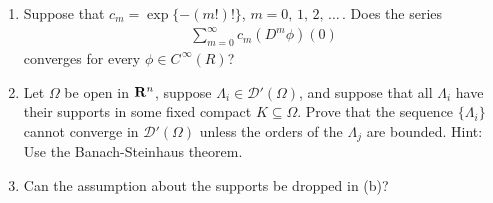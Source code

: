 %
\renewcommand{\labelenumi}{(\alph{enumi})} 
{\it 
\begin{enumerate}
\item Suppose that $c_m=\exp\{\minus (m!)!\}$, $m=0,\, 1,\, 2,\, \dots\, $. Does the series
\begin{align*}{
\sum_{m=0}^\infty c_m (D^m\phi)(0)
}\end{align*}
converges for every $\phi\in C^{\,\infty} (R)$?
\item Let $\Omega$ be open in ${\mathbf R}^n$, suppose $\Lambda_i\in \mathscr{D}'(\Omega)$, and suppose that all $\Lambda_i$ have their supports in some fixed compact $K\subseteq \Omega$. Prove that the sequence $\{\Lambda_i\}$ cannot converge in $\mathscr{D}'(\Omega)$ unless the orders of the $\Lambda_j$ are bounded. Hint: Use the Banach-Steinhaus theorem.
\item Can the assumption about the supports be dropped in (b)?
\end{enumerate}}

